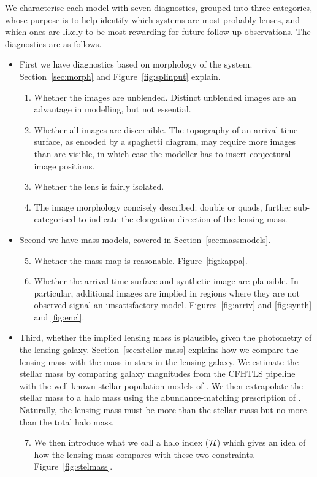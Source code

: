 We characterise each model with seven diagnostics, grouped into three 
categories, whose purpose is to help identify which systems are most probably 
lenses, and which ones are likely to be most rewarding for future follow-up 
observations. The diagnostics are as follows.

\begin{itemize}
\item First we have diagnostics based on morphology of the
  system.
  Section~\ref{sec:morph} and Figure~\ref{fig:splinput} explain.
\begin{enumerate}
\item Whether the images are unblended.  Distinct unblended images are
  an advantage in modelling, but not essential.
\item Whether all images are discernible.  The topography of an
  arrival-time surface, as encoded by a spaghetti diagram, may require
  more images than are visible, in which case the modeller has to
  insert conjectural image positions.
\item Whether the lens is fairly isolated.
\item The image morphology concisely described: double or quads,
  further sub-categorised to indicate the elongation direction of the
  lensing mass.
\end{enumerate}
\item Second we have mass models, covered in Section~\ref{sec:massmodels}.
\begin{enumerate}
\setcounter{enumi}{4}
\item Whether the mass map is reasonable. Figure~\ref{fig:kappa}.
\item Whether the arrival-time surface and synthetic image are
  plausible.  In particular, additional images are implied in regions
  where they are not observed signal an unsatisfactory model.
  Figures~\ref{fig:arriv} and \ref{fig:synth} and \ref{fig:encl}.
\end{enumerate}
\item Third, whether the implied lensing mass is plausible, given the
  photometry of the lensing galaxy.  Section~\ref{sec:stellar-mass}
  explains how we compare the lensing mass with the mass in stars in
  the lensing galaxy.  We estimate the stellar mass by comparing
  galaxy magnitudes from the CFHTLS pipeline with the well-known
  stellar-population models of \cite{2003MNRAS.344.1000B}.  We then
  extrapolate the stellar mass to a halo mass using the
  abundance-matching prescription of \cite{2010ApJ...710..903M}.
  Naturally, the lensing mass must be more than the stellar mass but
  no more than the total halo mass.
\begin{enumerate}
\setcounter{enumi}{6}
\item We then introduce what we call a halo index ($\mathcal{H}$) which
  gives an idea of how the lensing mass compares with these two
  constraints.  Figure~\ref{fig:stelmass}.
\end{enumerate}
\end{itemize}

